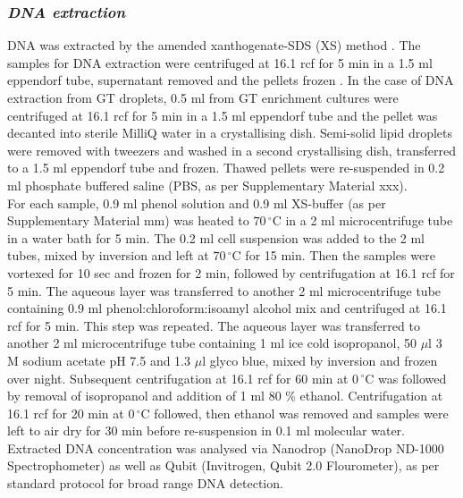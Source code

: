 \documentclass[twoside]{article}
\begin{document}
\subsubsection{\emph{DNA extraction}}
DNA was extracted by the amended xanthogenate-SDS (XS) method \cite{tillett2000xanthogenate}. The samples for DNA extraction were centrifuged at 16.1 rcf for 5 min in a 1.5 ml eppendorf tube, supernatant removed and the pellets frozen . In the case of DNA extraction from GT droplets, 0.5 ml from GT enrichment cultures were centrifuged at 16.1 rcf for 5 min in a 1.5 ml eppendorf tube and the pellet was decanted into sterile MilliQ water in a crystallising dish. Semi-solid lipid droplets were removed with tweezers and washed in a second crystallising dish, transferred to a 1.5 ml eppendorf tube and frozen. Thawed pellets were re-suspended in 0.2 ml phosphate buffered saline (PBS, as per Supplementary Material xxx).\\


For each sample, 0.9 ml phenol solution and 0.9 ml XS-buffer (as per Supplementary Material mm) was  heated to $70\,^{\circ}\mathrm{C}$ in a 2 ml microcentrifuge tube in a water bath for 5 min. The 0.2 ml cell suspension was added to the 2 ml tubes, mixed by inversion and left at $70\,^{\circ}\mathrm{C}$ for 15 min. Then the samples were vortexed for 10 sec and frozen for 2 min, followed by centrifugation at 16.1 rcf for 5 min. The aqueous layer was transferred to another 2 ml microcentrifuge tube containing 0.9 ml phenol:chloroform:isoamyl alcohol mix and centrifuged at 16.1 rcf for 5 min. This step was repeated. The aqueous layer was transferred to another 2 ml microcentrifuge tube containing 1 ml ice cold isopropanol, 50 $\mu$l 3 M sodium acetate pH 7.5 and 1.3 $\mu$l glyco blue, mixed by inversion and frozen over night. Subsequent centrifugation at 16.1 rcf for 60 min at $0\,^{\circ}\mathrm{C}$ was followed by removal of isopropanol and addition of 1 ml 80 \% ethanol. Centrifugation at 16.1 rcf for 20 min at $0\,^{\circ}\mathrm{C}$ followed, then ethanol was removed and samples were left to air dry for 30 min before re-suspension in 0.1 ml molecular water.
\\ 
Extracted DNA concentration was analysed via Nanodrop (NanoDrop ND-1000 Spectrophometer) as well as Qubit (Invitrogen, Qubit 2.0 Flourometer), as per standard protocol for broad range DNA detection.
\end{document}
